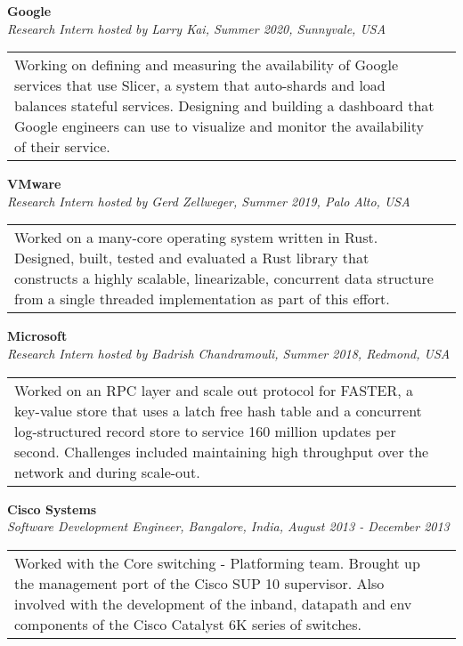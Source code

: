 \documentclass[margin,line]{res}
\begin{document}
\begin{resume}
\vspace{-2.5pt}
{\bf Google}\\
{\small\em Research Intern hosted by Larry Kai, Summer 2020, Sunnyvale, USA}\\
\begin{tabular}{@{}p{5.5in}p{4in}}
{\small Working on defining and measuring the availability of Google
services that use Slicer, a system that auto-shards and load balances
stateful services. Designing and building a dashboard that Google engineers
can use to visualize and monitor the availability of their service.}
\end{tabular}

\newpage

\vspace{-2.5pt}
{\bf VMware}\\
{\small\em Research Intern hosted by Gerd Zellweger, Summer 2019, Palo Alto, USA}\\
\begin{tabular}{@{}p{5.5in}p{4in}}
{\small Worked on a many-core operating system written in Rust.
Designed,
built, tested and evaluated a Rust library that constructs a highly scalable, linearizable,
concurrent data
structure from a single threaded implementation as part
of this effort.}
\end{tabular}

\vspace{-2.5pt}
{\bf Microsoft}\\
{\small\em Research Intern hosted by Badrish Chandramouli, Summer 2018, Redmond, USA}\\
\begin{tabular}{@{}p{5.5in}p{4in}}
{\small Worked on an RPC layer and scale out protocol for FASTER, a
key-value store that uses a latch free hash table and a concurrent
log-structured record
store to service 160 million updates per second. Challenges included
maintaining high throughput over the network and during scale-out.}
\end{tabular}

\vspace{-2.5pt}
{\bf Cisco Systems}\\
{\small\em Software Development Engineer, Bangalore, India, August 2013 - December 2013}\\
\begin{tabular}{@{}p{5.5in}p{4in}}
Worked with the Core switching - Platforming team. Brought up the management port of the
Cisco SUP 10 supervisor. Also involved with the
development of the inband, datapath and env components of the
Cisco Catalyst 6K series of switches.
\end{tabular}


\end{resume}
\end{document}
